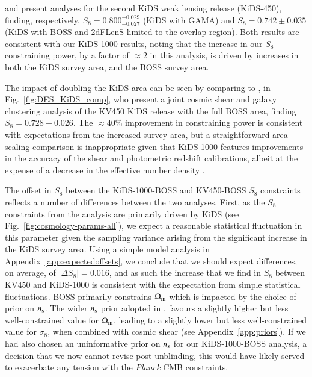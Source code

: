 \citet{vanuitert/etal:2018} and \citet{joudaki/etal:2018} present \tttp analyses for the second KiDS weak lensing release (KiDS-450), finding, respectively, $S_8 = 0.800_{-0.027}^{+0.029}$ (KiDS with GAMA) and $S_8 = 0.742 \pm 0.035$ (KiDS with BOSS and 2dFLenS limited to the overlap region). 
Both results are consistent with our KiDS-1000 results, noting that the increase in our $S_8$ constraining power, by a factor of $\approx\! 2$ in this analysis, is driven by increases in both the KiDS survey area, and the BOSS survey area.  

The impact of doubling the KiDS area can be seen by comparing to \citet{troester/etal:2020}, in Fig.~\ref{fig:DES_KiDS_comp}, who present a joint cosmic shear and galaxy clustering analysis of the KV450 KiDS release with the full BOSS area, finding $S_8 = 0.728 \pm 0.026$.   The $\approx\!40\%$ improvement in constraining power is consistent with expectations from the increased survey area, but a straightforward area-scaling comparison is inappropriate given that KiDS-1000 features improvements in the accuracy of the shear and photometric redshift calibrations, albeit at the expense of a decrease in the effective number density \citep[see][for details]{giblin/etal:inprep,hildebrandt/etal:inprep}.  

The offset in $S_8$ between the KiDS-1000-BOSS and KV450-BOSS $S_8$ constraints reflects a number of differences between the two analyses.  First, as the $S_8$ constraints from the \tttp analysis are primarily driven by KiDS (see Fig.~\ref{fig:cosmology-params-all}), we expect a reasonable statistical fluctuation in this parameter given the sampling variance arising from the significant increase in the KiDS survey area.  Using a simple model analysis in Appendix~\ref{app:expectedoffsets}, we conclude that we should expect differences, on average, of $|\Delta S_8| = 0.016$, and as such the increase that we find in $S_8$ between KV450 and KiDS-1000 is consistent with the expectation from simple statistical fluctuations.   BOSS primarily constrains $\Omega_{\rm m}$ which is impacted by the choice of prior on $n_{\rm s}$.  The wider $n_{\rm s}$ prior adopted in \citet{troester/etal:2020}, favours a slightly higher but less well-constrained value for $\Omega_{\rm m}$, leading to a slightly lower but less well-constrained value for $\sigma_8$, when combined with cosmic shear (see Appendix~\ref{app:priors}).   If we had also chosen an uninformative prior on $n_{\rm s}$ for our KiDS-1000-BOSS analysis, a decision that we now cannot revise post unblinding, this would have likely served to exacerbate any tension with the {\it Planck} CMB constraints.   




